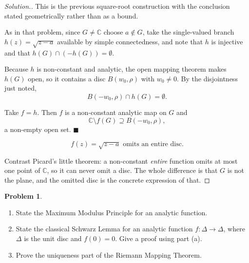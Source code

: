 \documentclass[11pt,a4paper]{article}
\theoremstyle{definition}
\newtheorem{problemx}{Problem}[section]
\newenvironment{problem}{\begin{problemx}}{\end{problemx}}
\newenvironment{solution}
  {\renewcommand{\qedsymbol}{}\begin{proof}[\textit{Solution}.]}
  {\end{proof}}
\begin{document}
\begin{solution}
This is the previous square-root construction with the conclusion stated
geometrically rather than as a bound.

As in that problem, since $G \neq \mathbb{C}$ choose $a \notin G$, take the
single-valued branch $h(z) = \sqrt{z-a}$ available by simple connectedness, and
note that $h$ is injective and that $h(G) \cap \left(-h(G)\right) = \emptyset$.

Because $h$ is non-constant and analytic, the open mapping theorem makes $h(G)$
open, so it contains a disc $B(w_0,\rho)$ with $w_0 \neq 0$. By the disjointness
just noted,
$$B(-w_0,\rho) \cap h(G) = \emptyset .$$

Take $f = h$. Then $f$ is a non-constant analytic map on $G$ and
$$\mathbb{C}\setminus f(G) \supseteq B(-w_0,\rho),$$
a non-empty open set. $\blacksquare$

$$\boxed{f(z) = \sqrt{z-a} \text{ omits an entire disc.}}$$

Contrast Picard's little theorem: a non-constant \emph{entire} function omits at
most one point of $\mathbb{C}$, so it can never omit a disc. The whole difference is
that $G$ is not the plane, and the omitted disc is the concrete expression of
that.
\end{solution}


\begin{problem}
\begin{enumerate}
\item[(a).] State the Maximum Modulus Principle for an analytic function.
\item[(b).] State the classical Schwarz Lemma for an analytic function
$f : \Delta \rightarrow \Delta$, where $\Delta$ is the unit disc and $f(0) = 0$.
Give a proof using part (a).
\item[(c).] Prove the uniqueness part of the Riemann Mapping Theorem.
\end{enumerate}
\end{problem}
\end{document}
